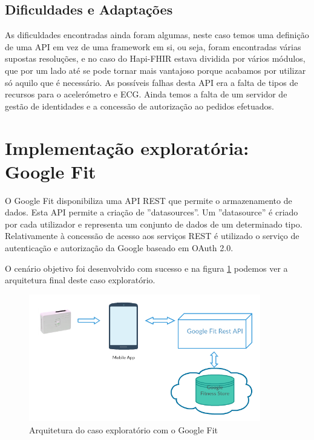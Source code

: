 \subsection{Dificuldades e Adaptações}
As dificuldades encontradas ainda foram algumas, neste caso temos uma definição de uma \gls{API} em vez de uma framework em si, ou seja, foram encontradas várias supostas resoluções, e no caso do Hapi-FHIR estava dividida por vários módulos, que por um lado até se pode tornar mais vantajoso porque acabamos por utilizar só aquilo que é necessário. As possíveis falhas desta \gls{API} era a falta de tipos de recursos para o acelerómetro e \gls{ECG}. Ainda temos a falta de um servidor de gestão de identidades e a concessão de autorização ao pedidos efetuados.

\section{Implementação exploratória: Google Fit}

O Google Fit disponibiliza uma \gls{API} \gls{REST} que permite o armazenamento de dados. Esta \gls{API} permite a criação  de ''datasources''. Um ''datasource'' é criado por cada utilizador e representa  um conjunto de dados de um determinado tipo. Relativamente à concessão de acesso aos serviços \gls{REST} é utilizado o serviço de autenticação e autorização da Google baseado em OAuth 2.0. 
\par
O cenário objetivo foi desenvolvido com sucesso e na figura \ref{f:exp-googlefit-arch} podemos ver a arquitetura final deste caso exploratório.
\begin{figure}[H]
  \centering
  \includegraphics[width=0.9\textwidth]{imgs/googlefit-arch-exp.png}
  \caption[Arquitetura do caso exploratório com o Google Fit]{Arquitetura do caso exploratório com o Google Fit}
  
  \label{f:exp-googlefit-arch}
\end{figure}

